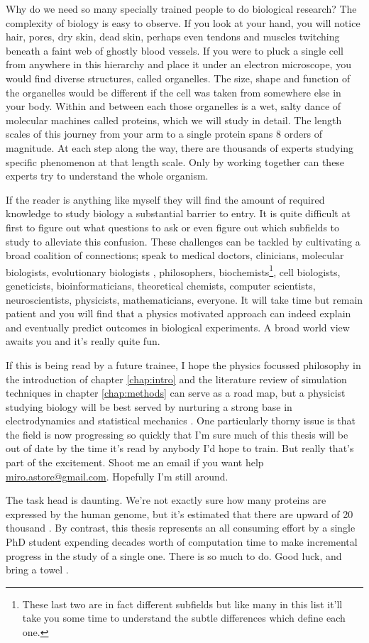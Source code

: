 Why do we need so many specially trained people to do biological research? The complexity of biology is easy to observe. If you look at your hand, you will notice hair, pores, dry skin, dead skin, perhaps even tendons and muscles twitching beneath a faint web of ghostly blood vessels. If you were to pluck a single cell from anywhere in this hierarchy and place it under an electron microscope, you would find diverse structures, called organelles. The size, shape and function of the organelles would be different if the cell was taken from somewhere else in your body. Within and between each those organelles is a wet, salty dance of molecular machines called proteins, which we will study in detail. The length scales of this journey from your arm to a single protein spans 8 orders of magnitude. At each step along the way, there are thousands of experts studying specific phenomenon at that length scale. Only by working together can these experts try to understand the whole organism.

If the reader is anything like myself they will find the amount of required knowledge to study biology a substantial barrier to entry. It is quite difficult at first to figure out what questions to ask or even figure out which subfields to study to alleviate this confusion. These challenges can be tackled by cultivating a broad coalition of connections; speak to medical doctors, clinicians, molecular biologists, evolutionary biologists \cite{dawkins1989, dawkins2016}, philosophers, biochemists\footnote{These last two are in fact different subfields but like many in this list it'll take you some time to understand the subtle differences which define each one.}, cell biologists, geneticists, bioinformaticians, theoretical chemists, computer scientists, neuroscientists, physicists, mathematicians, everyone. It will take time but remain patient and you will find that a physics motivated approach can indeed explain and eventually predict outcomes in biological experiments. A broad world view awaits you and it's really quite fun. 

If this is being read by a future trainee, I hope the physics focussed philosophy in the introduction of chapter \ref{chap:intro} and the literature review of simulation techniques in chapter \ref{chap:methods} can serve as a road map, but a physicist studying biology will be best served by nurturing a strong base in electrodynamics and statistical mechanics \cite{griffiths2017, reif2009, zuckerman2010}. One particularly thorny issue is that the field is now progressing so quickly that I'm sure much of this thesis will be out of date by the time it's read by anybody I'd hope to train. But really that's part of the excitement. Shoot me an email if you want help \href{mailto:miro.astore@gmailcom}{miro.astore@gmail.com}. Hopefully I'm still around.

The task head is daunting. We're not exactly sure how many proteins are expressed by the human genome, but it's estimated that there are upward of 20 thousand \cite{salzberg2018}. By contrast, this thesis represents an all consuming effort by a single PhD student expending decades worth of computation time to make incremental progress in the study of a single one. There is so much to do. Good luck, and bring a towel \cite{adams1979}. 

